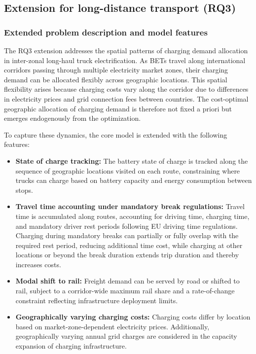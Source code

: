     \subsection{Extension for long-distance transport (RQ3)}\label{sec:rq3_extension}

        \subsubsection{Extended problem description and model features}

        The RQ3 extension addresses the spatial patterns of charging demand allocation in inter-zonal long-haul truck electrification. As \acp{BET} travel along international corridors passing through multiple electricity market zones, their charging demand can be allocated flexibly across geographic locations. This spatial flexibility arises because charging costs vary along the corridor due to differences in electricity prices and grid connection fees between countries. The cost-optimal geographic allocation of charging demand is therefore not fixed a priori but emerges endogenously from the optimization.

        To capture these dynamics, the core model is extended with the following features:
        \begin{itemize}
            \item \textbf{State of charge tracking:} The battery state of charge is tracked along the sequence of geographic locations visited on each route, constraining where trucks can charge based on battery capacity and energy consumption between stops.

            \item \textbf{Travel time accounting under mandatory break regulations:} Travel time is accumulated along routes, accounting for driving time, charging time, and mandatory driver rest periods following EU driving time regulations. Charging during mandatory breaks can partially or fully overlap with the required rest period, reducing additional time cost, while charging at other locations or beyond the break duration extends trip duration and thereby increases costs.

            \item \textbf{Modal shift to rail:} Freight demand can be served by road or shifted to rail, subject to a corridor-wide maximum rail share and a rate-of-change constraint reflecting infrastructure deployment limits.

            \item \textbf{Geographically varying charging costs:} Charging costs differ by location based on market-zone-dependent electricity prices. Additionally, geographically varying annual grid charges are considered in the capacity expansion of charging infrastructure.
        \end{itemize}

